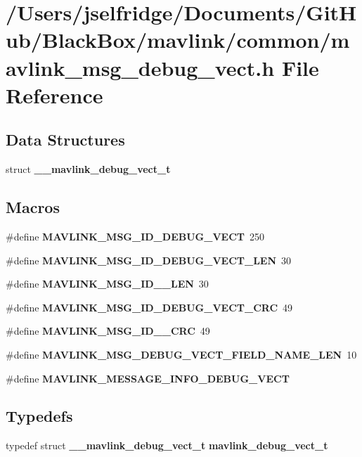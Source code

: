 \section{/\+Users/jselfridge/\+Documents/\+Git\+Hub/\+Black\+Box/mavlink/common/mavlink\+\_\+msg\+\_\+debug\+\_\+vect.h File Reference}
\label{mavlink__msg__debug__vect_8h}
\subsection*{Data Structures}
\begin{DoxyCompactItemize}
\item 
struct \textbf{ \+\_\+\+\_\+mavlink\+\_\+debug\+\_\+vect\+\_\+t}
\end{DoxyCompactItemize}
\subsection*{Macros}
\begin{DoxyCompactItemize}
\item 
\#define \textbf{ M\+A\+V\+L\+I\+N\+K\+\_\+\+M\+S\+G\+\_\+\+I\+D\+\_\+\+D\+E\+B\+U\+G\+\_\+\+V\+E\+CT}~250
\item 
\#define \textbf{ M\+A\+V\+L\+I\+N\+K\+\_\+\+M\+S\+G\+\_\+\+I\+D\+\_\+\+D\+E\+B\+U\+G\+\_\+\+V\+E\+C\+T\+\_\+\+L\+EN}~30
\item 
\#define \textbf{ M\+A\+V\+L\+I\+N\+K\+\_\+\+M\+S\+G\+\_\+\+I\+D\+\_\+\_\+\+L\+EN}~30
\item 
\#define \textbf{ M\+A\+V\+L\+I\+N\+K\+\_\+\+M\+S\+G\+\_\+\+I\+D\+\_\+\+D\+E\+B\+U\+G\+\_\+\+V\+E\+C\+T\+\_\+\+C\+RC}~49
\item 
\#define \textbf{ M\+A\+V\+L\+I\+N\+K\+\_\+\+M\+S\+G\+\_\+\+I\+D\+\_\+\_\+\+C\+RC}~49
\item 
\#define \textbf{ M\+A\+V\+L\+I\+N\+K\+\_\+\+M\+S\+G\+\_\+\+D\+E\+B\+U\+G\+\_\+\+V\+E\+C\+T\+\_\+\+F\+I\+E\+L\+D\+\_\+\+N\+A\+M\+E\+\_\+\+L\+EN}~10
\item 
\#define \textbf{ M\+A\+V\+L\+I\+N\+K\+\_\+\+M\+E\+S\+S\+A\+G\+E\+\_\+\+I\+N\+F\+O\+\_\+\+D\+E\+B\+U\+G\+\_\+\+V\+E\+CT}
\end{DoxyCompactItemize}
\subsection*{Typedefs}
\begin{DoxyCompactItemize}
\item 
typedef struct \textbf{ \+\_\+\+\_\+mavlink\+\_\+debug\+\_\+vect\+\_\+t} \textbf{ mavlink\+\_\+debug\+\_\+vect\+\_\+t}
\end{DoxyCompactItemize}


